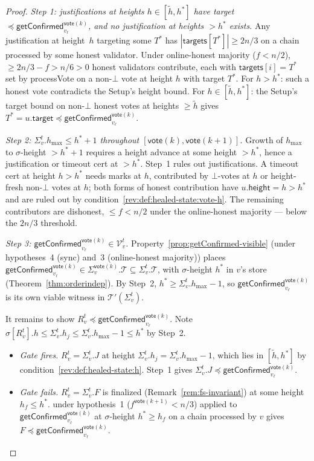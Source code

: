 \ifx\litemode\undefined\documentclass{article}\fi
\newcommand{\T}[0]{\ensuremath{\mathcal{T}}}
\newcommand{\V}[0]{\ensuremath{\mathcal{V}}}
\newcommand{\target}{\mathsf{target}}
\newcommand{\height}{\mathsf{height}}
\newcommand{\targets}{\mathsf{targets}}
\newcommand{\hmax}{\ensuremath{h_{\max}}\xspace}
\newcommand{\processVote}{\textsf{processVote}\xspace}
\newcommand{\vote}{\ensuremath{\mathsf{vote}}}
\newcommand{\comm}[1]{\ensuremath{\widetilde{#1}}}
\newcommand{\getConfirmed}{\textsf{getConfirmed}\xspace}
\theoremstyle{plain}
\theoremstyle{definition}
\theoremstyle{remark}
\begin{document}
\begin{proof}
\medskip

\emph{Step 1: justifications at heights $h \in [\comm{h}, h^\ast]$ have target $\preceq \getConfirmed_{v_\ell}^{\vote(k)}$, and no justification at heights $> h^\ast$ exists.}
Any justification at height~$h$ targeting some $T^\ast$ has $|\targets[T^\ast]| \geq 2n/3$ on a chain processed by some honest validator.
Under online-honest majority ($f < n/2$), $\geq 2n/3 - f > n/6 > 0$ honest validators contribute, each with $\targets[i] = T^\ast$ set by \processVote{} on a non-$\bot$ vote at height $h$ with target $T^\ast$.
For $h > h^\ast$: such a honest vote contradicts the Setup's height bound.
For $h \in [\comm{h}, h^\ast]$: the Setup's target bound on non-$\bot$ honest votes at heights $\geq \comm{h}$ gives $T^\ast = u.\target \preceq \getConfirmed_{v_\ell}^{\vote(k)}$.

\emph{Step 2: $\Sigma_v^t.\hmax \leq h^\ast + 1$ throughout $[\vote(k), \vote(k{+}1)]$.}
Growth of $\hmax$ to $\sigma$-height $> h^\ast + 1$ requires a height advance at some height $> h^\ast$, hence a justification or timeout cert at $> h^\ast$.
Step~1 rules out justifications.
A timeout cert at height $h > h^\ast$ needs marks at $h$, contributed by $\bot$-votes at $h$ or height-fresh non-$\bot$ votes at $h$;
both forms of honest contribution have $u.\height = h > h^\ast$ and are ruled out by condition~\ref{rev:def:healed-state:vote-h}.
The remaining contributors are dishonest, $\leq f < n/2$ under the online-honest majority --- below the $2n/3$ threshold.

\emph{Step 3: $\getConfirmed_{v_\ell}^{\vote(k)} \in \V_v^t$.}
Property~\ref{prop:getConfirmed-visible} (under hypotheses~4 (sync) and~3 (online-honest majority)) places $\getConfirmed_{v_\ell}^{\vote(k)} \in \Sigma_v^{\vote(k)}.\T \subseteq \Sigma_v^t.\T$, with $\sigma$-height $h^\ast$ in $v$'s store (Theorem~\ref{thm:orderindep}).
By Step~2, $h^\ast \geq \Sigma_v^t.\hmax - 1$, so $\getConfirmed_{v_\ell}^{\vote(k)}$ is its own viable witness in $\T'(\Sigma_v^t)$.

It remains to show $R_v^t \preceq \getConfirmed_{v_\ell}^{\vote(k)}$.
Note $\sigma[R_v^t].h \leq \Sigma_v^t.h_j \leq \Sigma_v^t.\hmax - 1 \leq h^\ast$ by Step~2.
\begin{itemize}
  \item \emph{Gate fires.} $R_v^t = \Sigma_v^t.J$ at height $\Sigma_v^t.h_j = \Sigma_v^t.\hmax - 1$, which lies in $[\comm{h}, h^\ast]$ by condition~\ref{rev:def:healed-state:h}.
  Step~1 gives $\Sigma_v^t.J \preceq \getConfirmed_{v_\ell}^{\vote(k)}$.
  \item \emph{Gate fails.} $R_v^t = \Sigma_v^t.F$ is finalized (Remark~\ref{rem:fs-invariant}) at some height $h_f \leq h^\ast$.
   under hypothesis~1 ($f^{\vote(k+1)} < n/3$) applied to $\getConfirmed_{v_\ell}^{\vote(k)}$ at $\sigma$-height $h^\ast \geq h_f$ on a chain processed by $v$ gives $F \preceq \getConfirmed_{v_\ell}^{\vote(k)}$.
\end{itemize}


\end{proof}
\end{document}
